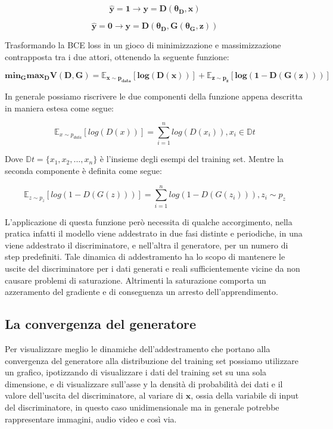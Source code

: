 \begin{equation}
    \mathbf{\hat{y} = 1 \rightarrow y = D(\theta_D, x)}
\end{equation}

\begin{equation}
    \mathbf{\hat{y} = 0 \rightarrow y = D(\theta_D, G(\theta_G, z))}
\end{equation}

Trasformando la BCE loss in un gioco di minimizzazione e massimizzazione contrapposta tra i due attori, ottenendo la seguente funzione: 

\begin{equation}
    \mathbf{min_G max_D V(D,G) = \mathbb{E}_{x\sim p_{data}}[log(D(x))] + \mathbb{E}_{z\sim p_{z}}[log(1 - D(G(z)))]}
\end{equation}

In generale possiamo riscrivere le due componenti della funzione appena descritta in maniera estesa come segue:

\begin{equation}
    \mathbb{E}_{x\sim p_{data}}[log(D(x))] = \sum_{i=1}^{n} log(D(x_i)), x_i \in \mathbb{D}t
\end{equation}

Dove $\mathbb{D}t = \{x_1, x_2, ..., x_n\}$ è l'insieme degli esempi del training set. Mentre la seconda componente è definita come segue:

\begin{equation}
    \mathbb{E}_{z\sim p_{z}}[log(1 - D(G(z)))] = \sum_{i=1}^{n} log(1 - D(G(z_i))), z_i \sim p_{z}
\end{equation}

L'applicazione di questa funzione però necessita di qualche accorgimento, nella pratica infatti il modello viene addestrato in due fasi distinte e periodiche,
in una viene addestrato il discriminatore, e nell'altra il generatore, per un numero di step predefiniti. 
Tale dinamica di addestramento ha lo scopo di mantenere le uscite
del discriminatore per i dati generati e reali sufficientemente vicine da non causare problemi di saturazione.
Altrimenti la saturazione comporta un azzeramento del gradiente e di conseguenza un arresto dell'apprendimento.

\subsection{La convergenza del generatore}
Per visualizzare meglio le dinamiche dell'addestramento che portano alla convergenza del generatore alla distribuzione del training set 
possiamo utilizzare un grafico, ipotizzando di visualizzare i dati del training set su una sola dimensione,
e di visualizzare sull'asse y la densità di probabilità dei dati e il valore dell'uscita del discriminatore, al variare di $\mathbf{x}$, ossia
della variabile di input del discriminatore, in questo caso unidimensionale ma in generale potrebbe rappresentare immagini, audio video e così via.

